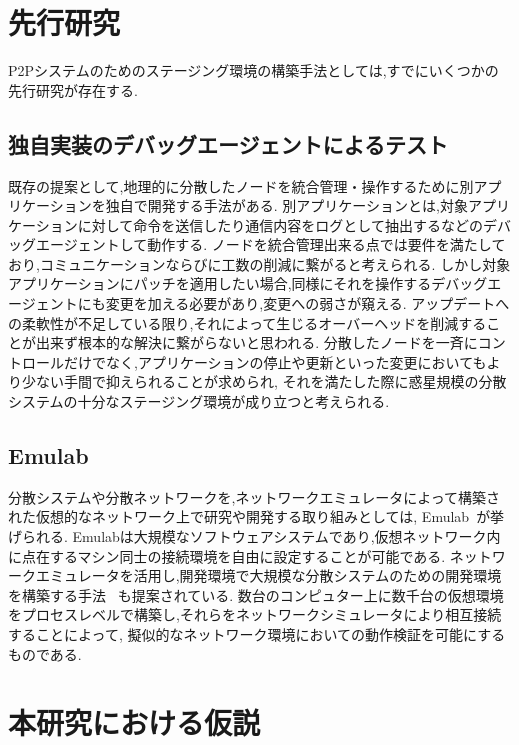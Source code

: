 {\section{先行研究}
\label{issue:previous-research}

P2Pシステムのためのステージング環境の構築手法としては,すでにいくつかの先行研究が存在する.

\subsection{独自実装のデバッグエージェントによるテスト}

既存の提案として,地理的に分散したノードを統合管理・操作するために別アプリケーションを独自で開発する手法がある.
別アプリケーションとは,対象アプリケーションに対して命令を送信したり通信内容をログとして抽出するなどのデバッグエージェントして動作する.
ノードを統合管理出来る点では要件を満たしており,コミュニケーションならびに工数の削減に繋がると考えられる.
しかし対象アプリケーションにパッチを適用したい場合,同様にそれを操作するデバッグエージェントにも変更を加える必要があり,変更への弱さが窺える.
アップデートへの柔軟性が不足している限り,それによって生じるオーバーヘッドを削減することが出来ず根本的な解決に繋がらないと思われる.
分散したノードを一斉にコントロールだけでなく,アプリケーションの停止や更新といった変更においてもより少ない手間で抑えられることが求められ,
それを満たした際に惑星規模の分散システムの十分なステージング環境が成り立つと考えられる.

\subsection{Emulab}
\label{consideration:related-works:emulab}

分散システムや分散ネットワークを,ネットワークエミュレータによって構築された仮想的なネットワーク上で研究や開発する取り組みとしては,
Emulab~\cite{Emulab}が挙げられる.
Emulabは大規模なソフトウェアシステムであり,仮想ネットワーク内に点在するマシン同士の接続環境を自由に設定することが可能である.
ネットワークエミュレータを活用し,開発環境で大規模な分散システムのための開発環境を構築する手法
~\cite{RelatedWork1}も提案されている.
数台のコンピュター上に数千台の仮想環境をプロセスレベルで構築し,それらをネットワークシミュレータにより相互接続することによって,
擬似的なネットワーク環境においての動作検証を可能にするものである.

\section{本研究における仮説}
\label{issue:hypothesis}

}
